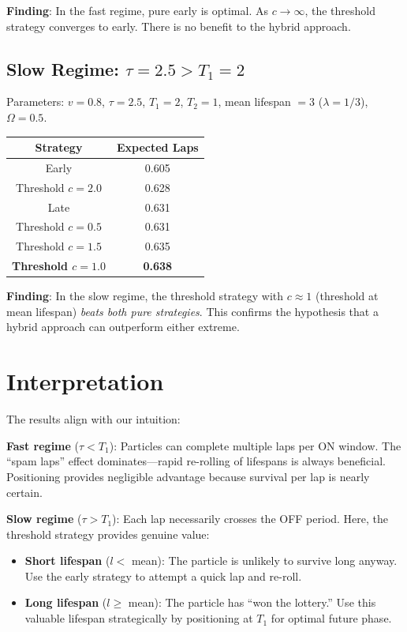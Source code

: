 \documentclass{article}
\begin{document}
\textbf{Finding}: In the fast regime, pure early is optimal. As $c \to \infty$, the threshold strategy converges to early. There is no benefit to the hybrid approach.

\subsection{Slow Regime: $\tau = 2.5 > T_1 = 2$}

Parameters: $v = 0.8$, $\tau = 2.5$, $T_1 = 2$, $T_2 = 1$, mean lifespan $= 3$ ($\lambda = 1/3$), $\Omega = 0.5$.

\begin{center}
\begin{tabular}{|c|c|}
\hline
\textbf{Strategy} & \textbf{Expected Laps} \\
\hline
Early & 0.605 \\
Threshold $c = 2.0$ & 0.628 \\
Late & 0.631 \\
Threshold $c = 0.5$ & 0.631 \\
Threshold $c = 1.5$ & 0.635 \\
\textbf{Threshold $c = 1.0$} & \textbf{0.638} \\
\hline
\end{tabular}
\end{center}

\textbf{Finding}: In the slow regime, the threshold strategy with $c \approx 1$ (threshold at mean lifespan) \emph{beats both pure strategies}. This confirms the hypothesis that a hybrid approach can outperform either extreme.

\section{Interpretation}

The results align with our intuition:

\textbf{Fast regime} ($\tau < T_1$): Particles can complete multiple laps per ON window. The ``spam laps'' effect dominates—rapid re-rolling of lifespans is always beneficial. Positioning provides negligible advantage because survival per lap is nearly certain.

\textbf{Slow regime} ($\tau > T_1$): Each lap necessarily crosses the OFF period. Here, the threshold strategy provides genuine value:
\begin{itemize}
    \item \textbf{Short lifespan} ($l < $ mean): The particle is unlikely to survive long anyway. Use the early strategy to attempt a quick lap and re-roll.
    \item \textbf{Long lifespan} ($l \geq $ mean): The particle has ``won the lottery.'' Use this valuable lifespan strategically by positioning at $T_1$ for optimal future phase.
\end{itemize}
\end{document}

